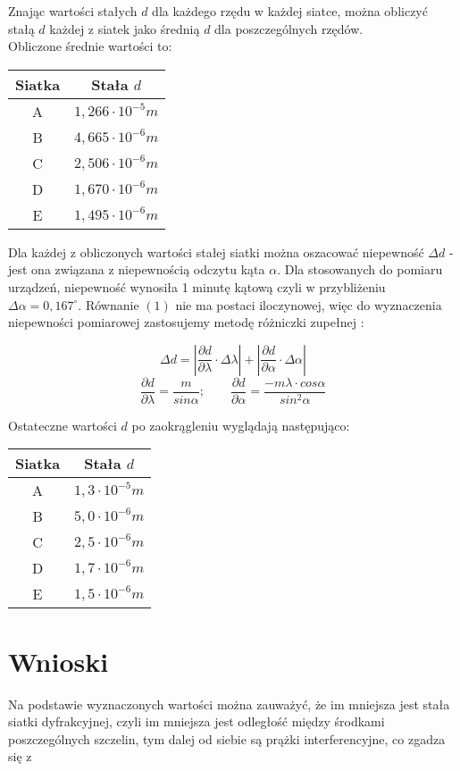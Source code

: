 \documentclass[10pt,a4paper]{article}
\newcommand{\forceindent}{\leavevmode{\parindent=3em\indent}}
\begin{document}
\forceindent Znając wartości stałych $d$ dla każdego rzędu w każdej siatce, można obliczyć stałą $d$ każdej z siatek jako średnią $d$ dla poszczególnych rzędów.\\
Obliczone średnie wartości to:
\begin{center}
\begin{tabular}{|c|c|}
\hline
Siatka & Stała $d$\\
\hline
A & $1,266 \cdot 10^{-5} m$\\
\hline
B & $4,665 \cdot 10^{-6} m$\\
\hline
C & $2,506 \cdot 10^{-6} m$\\
\hline
D & $1,670 \cdot 10^{-6} m$\\
\hline
E & $1,495 \cdot 10^{-6} m$\\
\hline
\end{tabular}
\end{center}

Dla każdej z obliczonych wartości stałej siatki można oszacować niepewność $\Delta d$ - jest ona związana z niepewnością odczytu kąta $\alpha$. Dla stosowanych do pomiaru urządzeń, 
niepewność wynosiła 1 minutę kątową czyli w przybliżeniu $\Delta \alpha = 0,167^\circ$. Równanie $(1)$ nie ma postaci iloczynowej, więc do wyznaczenia niepewności pomiarowej zastosujemy metodę różniczki zupełnej :

$$
\Delta d = | \frac{\partial d}{\partial \lambda} \cdot \Delta \lambda | + | \frac{\partial d}{\partial \alpha} \cdot \Delta \alpha | 
$$ 
$$
\frac{\partial d}{\partial \lambda} = \frac{m}{sin\alpha}; \qquad \frac{\partial d}{\partial \alpha} = \frac{-m\lambda \cdot cos\alpha}{sin^2 \alpha}
$$ 


Ostateczne wartości $d$ po zaokrągleniu wyglądają następująco:

\begin{center}
\begin{tabular}{|c|c|}
\hline
Siatka & Stała $d$\\
\hline
A & $1,3 \cdot 10^{-5} m$\\
\hline
B & $5,0 \cdot 10^{-6} m$\\
\hline
C & $2,5 \cdot 10^{-6} m$\\
\hline
D & $1,7 \cdot 10^{-6} m$\\
\hline
E & $1,5 \cdot 10^{-6} m$\\
\hline
\end{tabular}
\end{center}

\section*{Wnioski}

Na podstawie wyznaczonych wartości można zauważyć, że im mniejsza jest stała siatki dyfrakcyjnej, czyli im mniejsza jest odległość między środkami poszczególnych szczelin, tym dalej od siebie są prążki interferencyjne, co zgadza się z 	 
\end{document}

